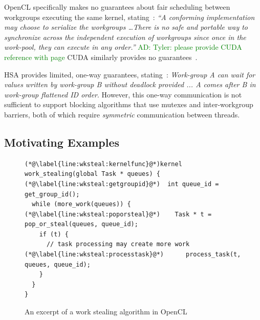 \documentclass[numbers,nocopyrightspace,10pt]{sigplanconf}
\newcommand{\ADComment}[1]{\textcolor{green}{AD: #1}}
\begin{document}
OpenCL specifically makes no guarantees about fair scheduling between
workgroups executing the same kernel, stating~\cite[p.\ 31]{opencl2Spec}: \emph{``A
  conforming implementation may choose to serialize the workgroups 
\dots There is no safe and portable way to synchronize across
  the independent execution of workgroups since once in the work-pool,
  they can execute in any order.''}  \ADComment{Tyler: please provide CUDA reference with page} CUDA similarly provides no guarantees~\cite{...}.

HSA provides limited, one-way guarantees,
stating~\cite[p. 46]{HSAprogramming11}: \emph{Work-group A can wait
  for values written by work-group B without deadlock provided ... A
  comes after B in work-group flattened ID order}. However, this
one-way communication is not sufficient to support blocking algorithms that use
mutexes and inter-workgroup barriers, both of which require \emph{symmetric} communication between
threads.


\subsection{Motivating Examples}\label{sec:openclexamples}

\begin{figure}

\begin{lstlisting}
(*@\label{line:wksteal:kernelfunc}@*)kernel work_stealing(global Task * queues) {
(*@\label{line:wksteal:getgroupid}@*)  int queue_id = get_group_id();
  while (more_work(queues)) {
(*@\label{line:wksteal:poporsteal}@*)    Task * t = pop_or_steal(queues, queue_id);
    if (t) {
      // task processing may create more work
(*@\label{line:wksteal:processtask}@*)      process_task(t, queues, queue_id);
    }
  }
}
\end{lstlisting}

\caption{An excerpt of a work stealing algorithm in OpenCL}\label{fig:workstealing}
\end{figure}
\end{document}
